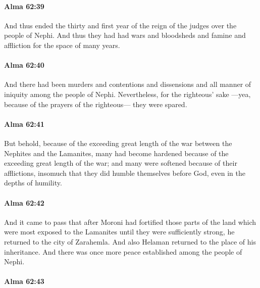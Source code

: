 		\paragraph{Alma 62:39} %
			\label{ALMA-62-39}

			And thus ended the thirty and first year
			of the reign of the judges over the people of Nephi.
			And thus they had had wars and bloodsheds and famine and affliction
			for the space of many years.

		\paragraph{Alma 62:40} %
			\label{ALMA-62-40}

			And there had been murders and contentions and dissensions
			and all manner of iniquity among the people of Nephi.
			Nevertheless, for the righteous' sake
			---yea, because of the prayers of the righteous---
			they were spared.

		\paragraph{Alma 62:41} %
			\label{ALMA-62-41}

			But behold, because of the exceeding great length of the war
			between the Nephites and the Lamanites,
			many had become hardened because of the exceeding great length of the war;
			and many were softened because of their afflictions,
			insomuch that they did humble themselves before God,
			even in the depths of humility.

		\paragraph{Alma 62:42} %
			\label{ALMA-62-42}

			And it came to pass that after Moroni had fortified those parts of the land
			which were most exposed to the Lamanites
			until they were sufficiently strong,
			he returned to the city of Zarahemla.
			And also Helaman returned to the place of his inheritance.
			And there was once more peace established among the people of Nephi.

		\paragraph{Alma 62:43} %
			\label{ALMA-62-43}

